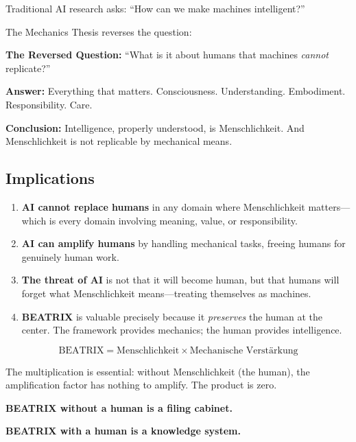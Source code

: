 Traditional AI research asks: ``How can we make machines intelligent?''

The Mechanics Thesis reverses the question:

\begin{tcolorbox}[colback=yellow!5!white, colframe=yellow!75!black]
\textbf{The Reversed Question:} ``What is it about humans that machines \textit{cannot} replicate?''

\textbf{Answer:} Everything that matters. Consciousness. Understanding. Embodiment. Responsibility. Care.

\textbf{Conclusion:} Intelligence, properly understood, is Menschlichkeit. And Menschlichkeit is not replicable by mechanical means.
\end{tcolorbox}

\subsection{Implications}

\begin{enumerate}
    \item \textbf{AI cannot replace humans} in any domain where Menschlichkeit matters---which is every domain involving meaning, value, or responsibility.

    \item \textbf{AI can amplify humans} by handling mechanical tasks, freeing humans for genuinely human work.

    \item \textbf{The threat of AI} is not that it will become human, but that humans will forget what Menschlichkeit means---treating themselves as machines.

    \item \textbf{BEATRIX} is valuable precisely because it \textit{preserves} the human at the center. The framework provides mechanics; the human provides intelligence.
\end{enumerate}

\begin{tcolorbox}[colback=green!5!white, colframe=green!75!black,
    title=The BEATRIX Principle (Restated)]
\begin{equation}
\text{BEATRIX} = \text{Menschlichkeit} \times \text{Mechanische Verstärkung}
\end{equation}

The multiplication is essential: without Menschlichkeit (the human), the amplification factor has nothing to amplify. The product is zero.

\textbf{BEATRIX without a human is a filing cabinet.}

\textbf{BEATRIX with a human is a knowledge system.}
\end{tcolorbox}


